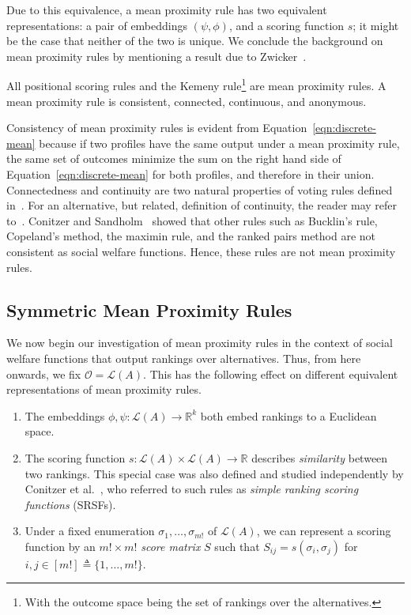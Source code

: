 \documentclass[prodmode,acmec]{ec-acmsmall}
\newcommand{\calL}{{\mathcal{L}}}
\newcommand{\rank}{{\calL(A)}}
\newcommand{\calO}{{\mathcal{O}}}
\newcommand{\kibitz}[2]{\ifnum\Comments=1\textcolor{#1}{#2}\fi}
\newcommand{\ns}[1]{\kibitz{red} {[NS: #1]}}
\begin{document}
Due to this equivalence, a mean proximity rule has two equivalent representations: a pair of embeddings $(\psi,\phi)$, and a scoring function $s$; it might be the case that neither of the two is unique. We conclude the background on mean proximity rules by mentioning a result due to Zwicker~.

\begin{proposition}
All positional scoring rules and the Kemeny rule\footnote{With the outcome space being the set of rankings over the alternatives.} are mean proximity rules. A mean proximity rule is consistent, connected, continuous, and anonymous.
\label{prop:properties}
\end{proposition}

Consistency of mean proximity rules is evident from Equation~\eqref{eqn:discrete-mean} because if two profiles have the same output under a mean proximity rule, the same set of outcomes minimize the sum on the right hand side of Equation~\eqref{eqn:discrete-mean} for both profiles, and therefore in their union. Connectedness and continuity are two natural properties of voting rules defined in~\cite{Zwicker08a}. For an alternative, but related, definition of continuity, the reader may refer to~\cite{CRX09}. Conitzer and Sandholm~ showed that other rules such as Bucklin's rule, Copeland's method, the maximin rule, and the ranked pairs method are not consistent as social welfare functions. Hence, these rules are not mean proximity rules. 


\subsection{Symmetric Mean Proximity Rules}
\label{sec:symm}

We now begin our investigation of mean proximity rules in the context of social welfare functions that output rankings over alternatives. Thus, from here onwards, we fix $\calO = \rank$. This has the following effect on different equivalent representations of mean proximity rules.
\begin{enumerate}
\item The embeddings $\phi,\psi : \rank \to \mathbb{R}^k$ both embed rankings to a Euclidean space. 
\item The scoring function $s : \rank \times \rank \rightarrow \mathbb{R}$ describes \emph{similarity} between two rankings. This special case was also defined and studied independently by Conitzer et al.~, who referred to such rules as \emph{simple ranking scoring functions} (SRSFs). 
\item Under a fixed enumeration $\sigma_1,\ldots,\sigma_{m!}$ of $\rank$, we can represent a scoring function by an $m! \times m!$ \emph{score matrix} $S$ such that $S_{ij} = s(\sigma_i,\sigma_j)$ for $i,j \in [m!] \triangleq \{1,\ldots,m!\}$. 
\end{enumerate}
\end{document}
